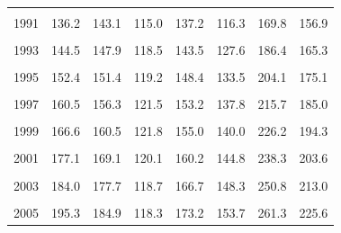 \documentclass[
]{article}
\begin{document}
\begin{enumerate}
\begin{table}[H]
\begin{tabular}[t]{rrrrrrrr}
   \cellcolor{gray!6}{1990} & \cellcolor{gray!6}{130.7} & \cellcolor{gray!6}{135.5} & \cellcolor{gray!6}{111.4} & \cellcolor{gray!6}{133.0} & \cellcolor{gray!6}{112.2} & \cellcolor{gray!6}{159.6} & \cellcolor{gray!6}{148.2}\\
   1991 & 136.2 & 143.1 & 115.0 & 137.2 & 116.3 & 169.8 & 156.9\\
   \cellcolor{gray!6}{1992} & \cellcolor{gray!6}{140.3} & \cellcolor{gray!6}{145.3} & \cellcolor{gray!6}{117.0} & \cellcolor{gray!6}{140.5} & \cellcolor{gray!6}{122.1} & \cellcolor{gray!6}{178.8} & \cellcolor{gray!6}{162.7}\\
   1993 & 144.5 & 147.9 & 118.5 & 143.5 & 127.6 & 186.4 & 165.3\\
   \cellcolor{gray!6}{1994} & \cellcolor{gray!6}{148.2} & \cellcolor{gray!6}{148.2} & \cellcolor{gray!6}{119.3} & \cellcolor{gray!6}{145.8} & \cellcolor{gray!6}{131.1} & \cellcolor{gray!6}{193.7} & \cellcolor{gray!6}{169.4}\\
   1995 & 152.4 & 151.4 & 119.2 & 148.4 & 133.5 & 204.1 & 175.1\\
   \cellcolor{gray!6}{1996} & \cellcolor{gray!6}{156.9} & \cellcolor{gray!6}{153.8} & \cellcolor{gray!6}{119.3} & \cellcolor{gray!6}{151.4} & \cellcolor{gray!6}{135.5} & \cellcolor{gray!6}{212.0} & \cellcolor{gray!6}{179.4}\\
   1997 & 160.5 & 156.3 & 121.5 & 153.2 & 137.8 & 215.7 & 185.0\\
   \cellcolor{gray!6}{1998} & \cellcolor{gray!6}{163.0} & \cellcolor{gray!6}{157.8} & \cellcolor{gray!6}{122.2} & \cellcolor{gray!6}{154.2} & \cellcolor{gray!6}{139.1} & \cellcolor{gray!6}{222.5} & \cellcolor{gray!6}{191.4}\\
   1999 & 166.6 & 160.5 & 121.8 & 155.0 & 140.0 & 226.2 & 194.3\\
   \cellcolor{gray!6}{2000} & \cellcolor{gray!6}{172.2} & \cellcolor{gray!6}{164.9} & \cellcolor{gray!6}{121.0} & \cellcolor{gray!6}{157.6} & \cellcolor{gray!6}{142.0} & \cellcolor{gray!6}{231.9} & \cellcolor{gray!6}{200.1}\\
   2001 & 177.1 & 169.1 & 120.1 & 160.2 & 144.8 & 238.3 & 203.6\\
   \cellcolor{gray!6}{2002} & \cellcolor{gray!6}{179.9} & \cellcolor{gray!6}{172.9} & \cellcolor{gray!6}{119.0} & \cellcolor{gray!6}{163.3} & \cellcolor{gray!6}{146.7} & \cellcolor{gray!6}{244.3} & \cellcolor{gray!6}{207.0}\\
   2003 & 184.0 & 177.7 & 118.7 & 166.7 & 148.3 & 250.8 & 213.0\\
   \cellcolor{gray!6}{2004} & \cellcolor{gray!6}{188.9} & \cellcolor{gray!6}{181.0} & \cellcolor{gray!6}{118.7} & \cellcolor{gray!6}{170.3} & \cellcolor{gray!6}{150.8} & \cellcolor{gray!6}{256.3} & \cellcolor{gray!6}{219.4}\\
   2005 & 195.3 & 184.9 & 118.3 & 173.2 & 153.7 & 261.3 & 225.6\\
   \bottomrule
   \end{tabular}
   \end{table}


\end{enumerate}
\end{document}

